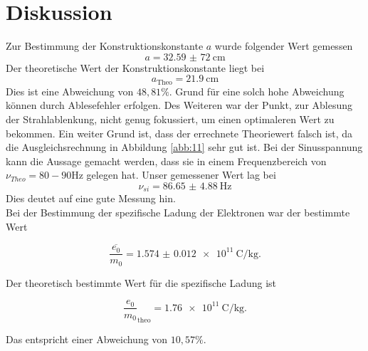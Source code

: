 \section{Diskussion}
Zur Bestimmung der Konstruktionskonstante $a$ wurde
folgender Wert gemessen
\begin{equation*}
    a = \SI{32,59(72)}{\centi\meter}
\end{equation*}
Der theoretische Wert der Konstruktionskonstante liegt bei
\begin{equation*}
   a_{\text{Theo}} = \SI{21.9}{\centi\meter}
\end{equation*}
Dies ist eine Abweichung von $48,81 \%$. Grund für eine solch hohe Abweichung
können durch Ablesefehler erfolgen. Des Weiteren war der Punkt, zur Ablesung der
Strahlablenkung, nicht genug fokussiert, um einen optimaleren Wert zu bekommen.
Ein weiter Grund ist, dass der errechnete Theoriewert falsch ist, da die Ausgleichsrechnung
in Abbildung \ref{abb:11} sehr gut ist. 
Bei der Sinusspannung kann die Aussage gemacht werden, dass sie in einem Frequenzbereich
von $\nu_{Theo}=80 - 90 \si{\hertz}$ gelegen hat.
Unser gemessener Wert lag bei
\begin{equation*}
  \nu_{si}= \SI{86.65(488)}{\hertz}
\end{equation*}
Dies deutet auf eine gute Messung hin.\\
Bei der Bestimmung der spezifische Ladung der Elektronen war der bestimmte Wert

\begin{equation*}
  \overline{\frac{e_0}{m_0}} = \SI{1.574(12)e11}{\coulomb\per\kilo\gram}.
\end{equation*}

Der theoretisch bestimmte Wert für die spezifische Ladung ist

\begin{equation*}
  \frac{e_0}{m_0}_\text{theo} = \SI{1.76e11}{\coulomb\per\kilo\gram}.
\end{equation*}

Das entspricht einer Abweichung von $10,57 \%$.

